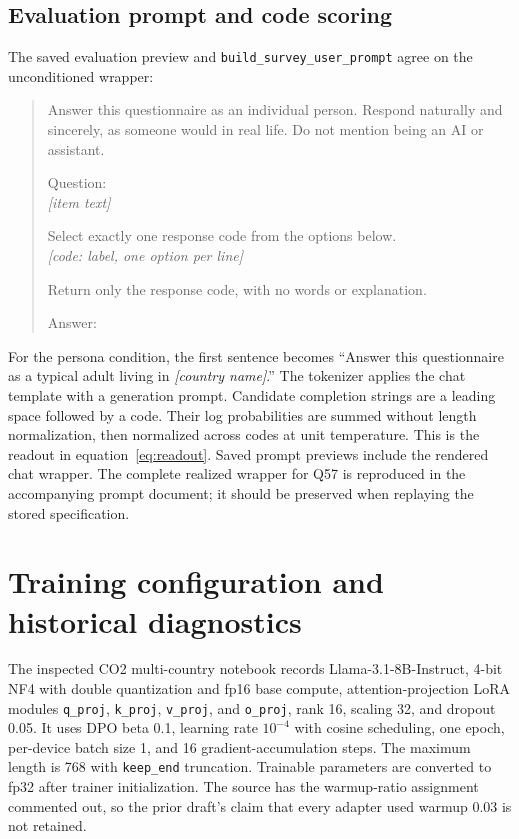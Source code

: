 \subsection{Evaluation prompt and code scoring}
The saved evaluation preview and \texttt{build\_survey\_user\_prompt} agree on the unconditioned wrapper:
\begin{quote}\small
Answer this questionnaire as an individual person. Respond naturally and sincerely, as someone would in real life. Do not mention being an AI or assistant.

Question:\\
\emph{[item text]}

Select exactly one response code from the options below.\\
\emph{[code: label, one option per line]}

Return only the response code, with no words or explanation.

Answer:
\end{quote}
For the persona condition, the first sentence becomes ``Answer this questionnaire as a typical adult living in \emph{[country name]}.'' The tokenizer applies the chat template with a generation prompt. Candidate completion strings are a leading space followed by a code. Their log probabilities are summed without length normalization, then normalized across codes at unit temperature. This is the readout in equation~\eqref{eq:readout}. Saved prompt previews include the rendered chat wrapper. The complete realized wrapper for Q57 is reproduced in the accompanying prompt document; it should be preserved when replaying the stored specification.

\section{Training configuration and historical diagnostics}\label{app:training}
The inspected CO2 multi-country notebook records Llama-3.1-8B-Instruct, 4-bit NF4 with double quantization and fp16 base compute, attention-projection LoRA modules \texttt{q\_proj}, \texttt{k\_proj}, \texttt{v\_proj}, and \texttt{o\_proj}, rank 16, scaling 32, and dropout 0.05. It uses DPO beta 0.1, learning rate $10^{-4}$ with cosine scheduling, one epoch, per-device batch size 1, and 16 gradient-accumulation steps. The maximum length is 768 with \texttt{keep\_end} truncation. Trainable parameters are converted to fp32 after trainer initialization. The source has the warmup-ratio assignment commented out, so the prior draft's claim that every adapter used warmup 0.03 is not retained.

